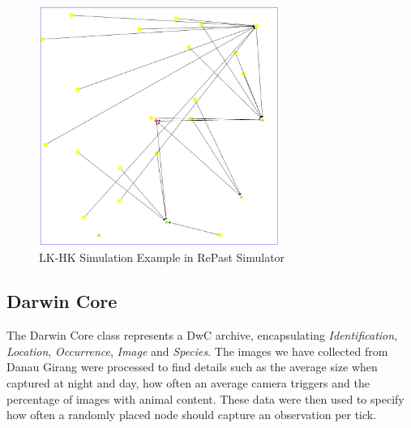 	\begin{figure}[h]
	\centering
	\includegraphics[width=0.70\textwidth]{Chap7/figures/khas_simulation}
	\caption{LK-HK Simulation Example in RePast Simulator}
	\label{fig:sim}
	\end{figure}



\subsection{Darwin Core}
The Darwin Core class represents a DwC archive, encapsulating \textit{Identification}, \textit{Location}, \textit{Occurrence}, \textit{Image} and \textit{Species}. The images we have collected from Danau Girang were processed to find details such as the average size when captured at night and day, how often an average camera triggers and the percentage of images with animal content. These data were then used to specify how often a randomly placed node should capture an observation per tick.

